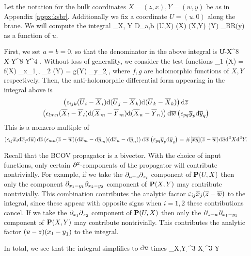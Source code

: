 \documentclass[../main.tex]{subfiles}
\begin{document}
Let the notation for the bulk coordinates $X = (z,x),Y=(w,y)$ be as in Appendix \ref{appx:ksbr}.
Additionally we fix a coordinate $U=(u,0)$ along the brane.
We will compute the integral
\beqn
\int_{X, Y} D_{a,b} \bP(U,X) \mu(X) \bP(X,Y) \mu(Y)  \mu_{BR}(y) 
\eeqn
as a function of $u$.

First, we set $a=b=0$, so that the denominator in the above integral is
\beqn
\|U-X\|^8 \|X-Y\|^8 \|Y\|^4 .
\eeqn
Without loss of generality, we consider the test functions
\beqn
\mu_1 (X) = f(X) \del_{x_1} \d \zbar, \quad \mu_2 (Y) = g(Y) \del_{y_2} \d \wbar ,
\eeqn
where $f,g$ are holomorphic functions of $X,Y$ respectively.
Then, the anti-holomorphic differential form appearing in the integral above is
\begin{multline}
\left({\epsilon}_{ijk} (\overline U_i - \overline X_i) \mathrm{d} (\overline U_j - \overline X_k) \mathrm{d} (\overline U_k - \overline X_k)\right) \mathrm{d} {\overline{z}}\\ \left({\epsilon}_{lmn} (\overline X_l - \overline Y_l) \mathrm{d} (\overline X_m - \overline Y_m) \mathrm{d} (\overline X_n - \overline Y_n)\right)\mathrm{d} \overline{w} \left({\epsilon}_{pq} \overline y_p \mathrm{d} \overline y_q \right)
\end{multline}
This is a nonzero multiple of
\begin{multline}
\left({\epsilon}_{ij} \overline x_i \mathrm{d} \overline x_j \mathrm{d} \overline u\right) \mathrm{d} {\overline{z}} \left({\epsilon}_{mn} (\overline z - \overline w) (\mathrm{d} \overline x_m - \mathrm{d} \overline y_m) (\mathrm{d} \overline x_n - \mathrm{d} \overline y_n) \right)
\mathrm{d} \overline w \left(\varepsilon_{pq} \overline y_p  \mathrm{d} \overline y_q\right) = 
\# [\overline x \overline y] (\overline z - \overline w) \mathrm{d} \overline u \mathrm{d}^3 X \mathrm{d}^3 Y .
\end{multline}

Recall that the BCOV propagator is a bivector.
With the choice of input functions, only certain $\partial^2$-components of the propagator will contribute nontrivially.
For example, if we take the $\partial_{u-z} \partial_{x_i}$ component of $\mathbf{P}(U,X)$ then only the component $\partial_{x_1 - y_1} \partial_{x_2-y_2}$ component of $\mathbf{P}(X,Y)$ may contribute nontrivially.
This combination contributes the analytic factor $\varepsilon_{ij} \overline x_j (\overline z - \overline w)$ to the integral, since these appear with opposite signs when $i=1,2$ these contributions cancel.
If we take the $\partial_{x_1} \partial_{x_2}$ component of $\mathbf{P}(U,X)$ then only the $\partial_{z-w} \partial_{x_1-y_1}$ component of $\mathbf{P}(X,Y)$ may contribute nontrivially.
This contributes the analytic factor $(\overline u - \overline z) (\overline x_1 - \overline y_1)$ to the integral.

In total, we see that the integral simplifies to $\mathrm{d} \overline u$ times 
\beqn
\int_{X,Y}  \d^3 X \d^3 Y
\eeqn
\end{document}
